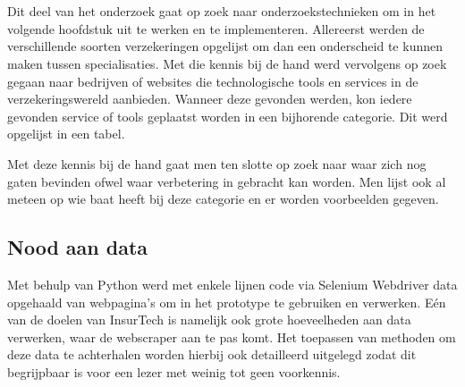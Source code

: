 
\chapter{}
\label{ch:voorbereiding-onderzoek}

\section{}
\label{sec:inleiding}

Dit deel van het onderzoek gaat op zoek naar onderzoekstechnieken om in het volgende hoofdstuk uit te werken en te implementeren.
Allereerst werden de verschillende soorten verzekeringen opgelijst om dan een onderscheid te kunnen maken tussen specialisaties.
Met die kennis bij de hand werd vervolgens op zoek gegaan naar bedrijven of websites die technologische tools en services in de verzekeringswereld aanbieden. Wanneer deze gevonden werden, kon iedere gevonden service of tools geplaatst worden in een bijhorende categorie. Dit werd opgelijst in een tabel.

Met deze kennis bij de hand gaat men ten slotte op zoek naar waar zich nog gaten bevinden ofwel waar verbetering in gebracht kan worden. Men lijst ook al meteen op wie baat heeft bij deze categorie en er worden voorbeelden gegeven.

\section{Nood aan data}
Met behulp van Python werd met enkele lijnen code via Selenium Webdriver data opgehaald van webpagina's om in het prototype te gebruiken en verwerken.
Eén van de doelen van InsurTech is namelijk ook grote hoeveelheden aan data verwerken, waar de webscraper aan te pas komt. Het toepassen van methoden om deze data te achterhalen worden hierbij ook detailleerd uitgelegd zodat dit begrijpbaar is voor een lezer met weinig tot geen voorkennis.

